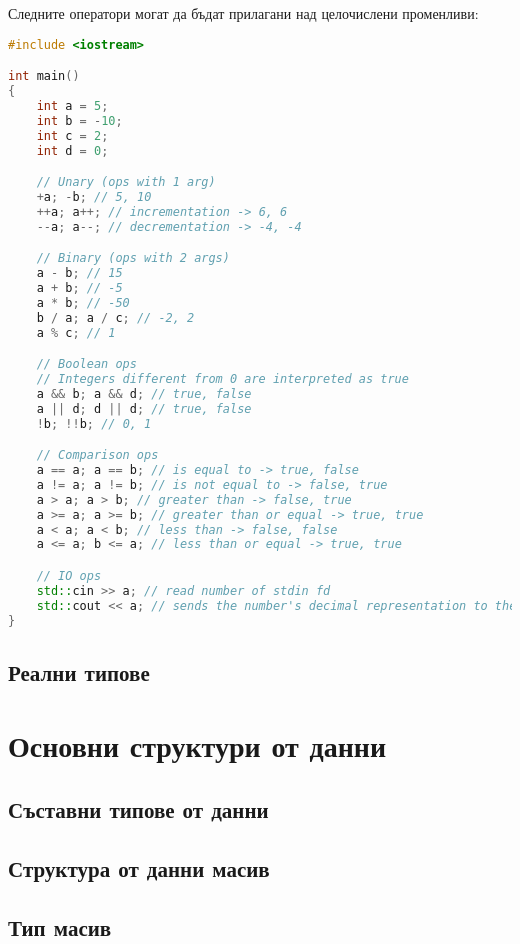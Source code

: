 \documentclass[fleqn,12pt]{article}
\begin{document}
\begin{flushleft}
Следните оператори могат да бъдат прилагани над целочислени променливи:

\begin{lstlisting}[language=C++, caption=Integer operators]
#include <iostream>

int main() 
{
    int a = 5;
    int b = -10;
    int c = 2;
    int d = 0;

    // Unary (ops with 1 arg)
    +a; -b; // 5, 10
    ++a; a++; // incrementation -> 6, 6
    --a; a--; // decrementation -> -4, -4

    // Binary (ops with 2 args)
    a - b; // 15
    a + b; // -5
    a * b; // -50
    b / a; a / c; // -2, 2
    a % c; // 1

    // Boolean ops
    // Integers different from 0 are interpreted as true
    a && b; a && d; // true, false
    a || d; d || d; // true, false
    !b; !!b; // 0, 1

    // Comparison ops
    a == a; a == b; // is equal to -> true, false
    a != a; a != b; // is not equal to -> false, true
    a > a; a > b; // greater than -> false, true
    a >= a; a >= b; // greater than or equal -> true, true
    a < a; a < b; // less than -> false, false
    a <= a; b <= a; // less than or equal -> true, true

    // IO ops
    std::cin >> a; // read number of stdin fd
    std::cout << a; // sends the number's decimal representation to the stdout fd
}
\end{lstlisting}

\subsection{Реални типове}

\section{Основни структури от данни}
\subsection{Съставни типове от данни}
\subsection{Структура от данни масив}
\subsection{Тип масив}


\end{flushleft}
\end{document}
